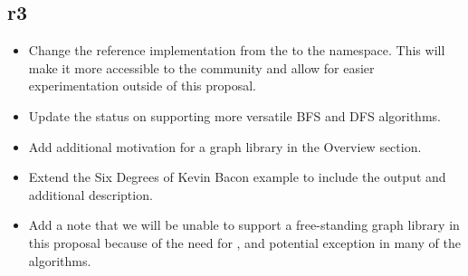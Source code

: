 \subsection*{\paperno r3}
\begin{itemize}
      \item Change the reference implementation from the  to the  namespace. This will
            make it more accessible to the community and allow for easier experimentation outside of this proposal.
      \item Update the status on supporting more versatile BFS and DFS algorithms.
      \item Add additional motivation for a graph library in the Overview section.
      \item Extend the Six Degrees of Kevin Bacon example to include the output and additional description.
      \item Add a note that we will be unable to support a free-standing graph library in this proposal because
            of the need for ,  and potential  exception in many of 
            the algorithms.
\end{itemize}
